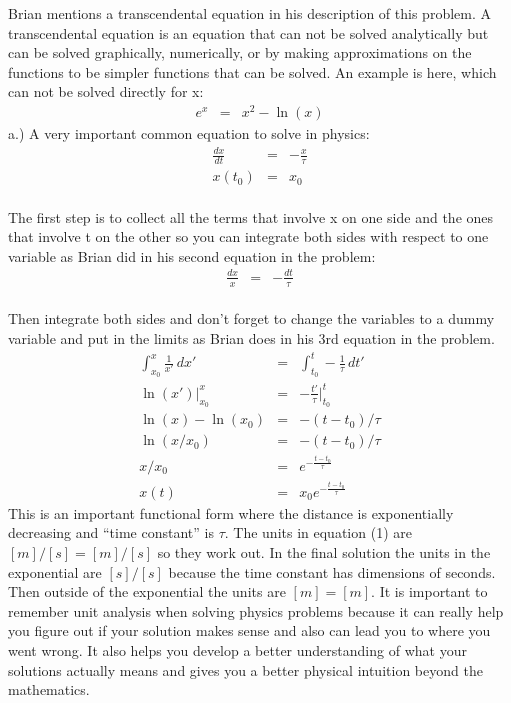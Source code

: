 \documentclass[11pt]{amsart}
\begin{document}
Brian mentions a transcendental equation in his description of this problem. A transcendental equation is an equation that can not be solved analytically but can be solved graphically, numerically, or by making approximations on the functions to be simpler functions that can be solved. An example is here, which can not be solved directly for x: \\ 
\begin{eqnarray*}
e^{x} &=& x^{2} - \ln(x) 
\end{eqnarray*}
a.) A very important common equation to solve in physics: \\ 
\begin{eqnarray*} 
\frac{dx}{dt} &=& -\frac{x}{\tau} \\
x(t_{0}) &=& x_{0} 
\end{eqnarray*}  \\
The first step is to collect all the terms that involve x on one side and the ones that involve t on the other so you can integrate both sides with respect to one variable as Brian did in his second equation in the problem: \\ 
\begin{eqnarray*} 
\frac{dx}{x} &=& -\frac{dt}{\tau} 
\end{eqnarray*} \\
Then integrate both sides and don't forget to change the variables to a dummy variable and put in the limits as Brian does in his 3rd equation in the problem. \\ 
\begin{eqnarray*} 
\int^{x}_{x_{0}}\frac{1}{x'}\,dx' &=& \int^{t}_{t_{0}}-\frac{1}{\tau}\,dt' \\
\ln(x')|^{x}_{x_{0}} &=& -\frac{t'}{\tau}|^{t}_{t_{0}} \\
\ln(x) - \ln(x_{0}) &=& -(t - t_{0})/\tau \\
\ln(x/x_{0}) &=& -(t - t_{0})/\tau 
\\
x/x_{0} &=& e^{-\frac{t-t_{0}}{\tau}} 
\\
x(t) &=& x_{0}e^{-\frac{t-t_{0}}{\tau}} 
\end{eqnarray*}
This is an important functional form where the distance is exponentially decreasing and ``time constant'' is $\tau$.  The units in equation (1) are $[m]/[s] = [m]/[s]$ so they work out. In the final solution the units in the exponential are $[s]/[s]$ because the time constant has dimensions of seconds. Then outside of the exponential the units are $[m]=[m]$. It is important to remember unit analysis when solving physics problems because it can really help you figure out if your solution makes sense and also can lead you to where you went wrong. It also helps you develop a better understanding of what your solutions actually means and gives you a better physical intuition beyond the mathematics. \\ \\
\end{document}
